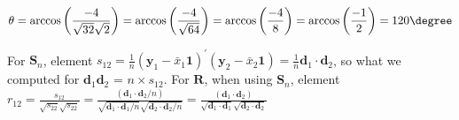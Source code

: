 \begin{enumerate}[label=(\alph*)]
\[        \theta
        =
        \arccos\left(\frac{-4}{\sqrt{32}\sqrt{2}}\right)
        =
        \arccos\left(\frac{-4}{\sqrt{64}}\right)
        =
        \arccos\left(\frac{-4}{8}\right)
        =
        \arccos\left(\frac{-1}{2}\right)
        =
        120\degree
    \]
    \par
    For $\textbf{S}_n$, element $s_{12} = \frac{1}{n}{\left(\textbf{y}_1 - \bar{x}_1\textbf{1}\right)}^\prime{\left(\textbf{y}_2 - \bar{x}_2\textbf{1}\right)} = \frac{1}{n}\textbf{d}_1\cdot\textbf{d}_2$, so what we computed for $\textbf{d}_1\textbf{d}_2$ = $n\times s_{12}$. For $\textbf{R}$, when using $\textbf{S}_n$, element $r_{12} = \frac{s_{12}}{\sqrt{s_{22}}\sqrt{s_{22}}} = \frac{(\textbf{d}_1\cdot\textbf{d}_2/n)}{\sqrt{\textbf{d}_1\cdot\textbf{d}_1/n}\sqrt{\textbf{d}_2\cdot\textbf{d}_2/n}} = \frac{(\textbf{d}_1\cdot\textbf{d}_2)}{\sqrt{\textbf{d}_1\cdot\textbf{d}_1}\sqrt{\textbf{d}_2\cdot\textbf{d}_2}}$
\end{enumerate}